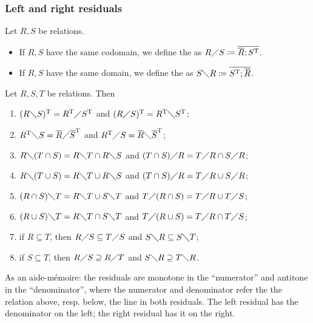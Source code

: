\subsubsection{Left and right residuals}
\begin{definition}
Let $R,S$ be relations.
\begin{itemize}
\item If $R,S$ have the same codomain, we define the  as $R\diagup S \coloneqq \overline{\overline{R}; S^{\mathrm{T}}}$.
\item If $R,S$ have the same domain, we define the  as $S\diagdown R \coloneqq \overline{S^{\mathrm{T}}; \overline{R}}$.
\end{itemize}
\end{definition}

\begin{lemma} \label{residuals}
Let $R,S,T$ be relations. Then
\begin{enumerate}
\item $(R\diagdown S)^{\mathrm{T}} = R^{\mathrm{T}}\diagup S^{\mathrm{T}}$ and $(R\diagup S)^{\mathrm{T}} = R^{\mathrm{T}}\diagdown S^{\mathrm{T}}$;
\item $R^{\mathrm{T}}\diagdown S = \overline{R}\diagup \overline{S}^{\mathrm{T}}$ and $R^{\mathrm{T}}\diagup S = \overline{R}\diagdown \overline{S}^{\mathrm{T}}$;
\item $R \diagdown (T\cap S) = R\diagdown T \cap R\diagdown S$ and $(T\cap S)\diagup R = T\diagup R \cap S\diagup R$;
\item $R \diagdown (T\cup S) = R\diagdown T \cup R\diagdown S$ and $(T\cap S)\diagup R = T\diagup R \cup S\diagup R$;
\item $(R\cap S) \diagdown T = R\diagdown T \cup S\diagdown T$ and $T\diagup (R\cap S) = T\diagup R \cup T\diagup S$;
\item $(R\cup S) \diagdown T = R\diagdown T \cap S\diagdown T$ and $T\diagup (R\cup S) = T\diagup R \cap T\diagup S$;
\item if $R\subseteq T$, then $R\diagup S \subseteq T\diagup S$ and $S\diagdown R \subseteq S\diagdown T$;
\item if $S\subseteq T$, then $R\diagup S \supseteq R\diagup T$ and $S\diagdown R \supseteq T\diagdown R$.
\end{enumerate}
\end{lemma}

As an aide-mémoire: the residuals are monotone in the ``numerator'' and antitone in the ``denominator'', where the numerator and denominator refer the the relation above, resp. below, the line in both residuals. The left residual has the denominator on the left; the right residual has it on the right.

